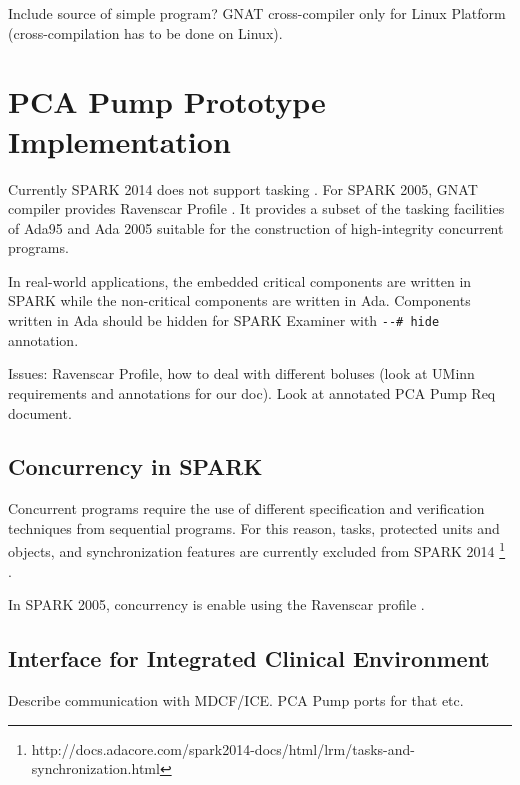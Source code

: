 Include source of simple program?
GNAT cross-compiler only for Linux Platform (cross-compilation has to be done on Linux).


\section{PCA Pump Prototype Implementation}
\label{pcapump:implementation}

Currently SPARK 2014 does not support tasking \cite{Spark2014refManual:Online}. For SPARK 2005, GNAT compiler provides Ravenscar Profile \cite{Ravenscar:Online}. It provides a subset of the tasking facilities of Ada95 and Ada 2005 suitable for the construction of high-integrity concurrent programs.

In real-world applications, the embedded critical components are written in SPARK while the non-critical components are written in Ada. Components written in Ada should be hidden for SPARK Examiner with \lstinline{--# hide} annotation.

Issues: Ravenscar Profile, how to deal with different boluses (look at UMinn requirements and annotations for our doc).
Look at annotated PCA Pump Req document.

\subsection{Concurrency in SPARK}
\label{pcapump:implementation:concurrency}

Concurrent programs require the use of different specification and verification techniques from sequential programs. For this reason, tasks, protected units and objects, and synchronization features are currently excluded from SPARK 2014 \footnote{http://docs.adacore.com/spark2014-docs/html/lrm/tasks-and-synchronization.html} \cite{Spark2014refManual:Online}.

In SPARK 2005, concurrency is enable using the Ravenscar profile \cite{Ravenscar:Online}. 

\cite{Ravenscar:Article}

\subsection{Interface for Integrated Clinical Environment}
\label{pcapump:implementation:ice}

Describe communication with MDCF/ICE. PCA Pump ports for that etc.